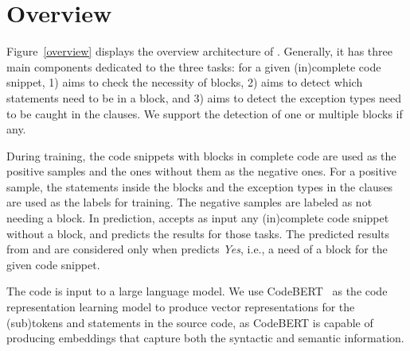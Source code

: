 \section{{\tool} Overview}
\label{sec:overview}

Figure~\ref{overview} displays the overview architecture of
{\tool}. Generally, it has three main components dedicated to the
three tasks: for a given (in)complete code snippet, 1) {\xblock} aims
to check the necessity of  blocks, 2){\xstate} aims to
detect which statements need to be in a  block, and 3)
{\xtype} aims to detect the exception types need to be caught in the
 clauses. We support the detection of one or multiple
 blocks if any.

During training, the code snippets with  blocks in
complete code are used as the positive samples and the ones without
them as the negative ones. For a positive sample, the statements
inside the  blocks and the exception types in the
 clauses are used as the labels for training. The negative
samples are labeled as not needing a  block. In
prediction, {\tool} accepts as input any (in)complete code
snippet without a  block, and predicts the results for
those tasks. The predicted results from {\xstate} and {\xtype} are
considered only when {\xblock} predicts {\em Yes}, i.e., a need of a
 block for the given code snippet.

The code is input to a large language model. We use
CodeBERT~\cite{codebert-emnlp20} as the code representation learning
model to produce vector representations for the (sub)tokens and
statements in the source code, as CodeBERT is capable of producing
embeddings that capture both the syntactic and semantic information.



